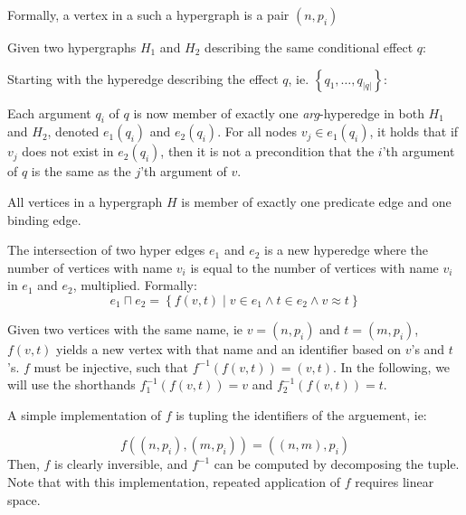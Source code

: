 \documentclass[../Master.tex]{subfiles}
\begin{document}
Formally, a vertex in a such a hypergraph is a pair $\left(n,p_i \right)$

Given two hypergraphs $H_1$ and $H_2$ describing the same conditional effect $q$:

Starting with the hyperedge describing the effect $q$, ie. $\left\{ q_1, \dots, q_{|q|}  \right\}$:

Each argument $q_i$ of $q$ is now member of exactly one \emph{arg}-hyperedge in  both $H_1$ and $H_2$, denoted $e_1(q_i)$ and $e_2(q_i)$. For all nodes $v_j \in e_1(q_i)$, it holds that  if $v_j$ does not exist in $e_2(q_i)$, then it is not a precondition that the $i$'th argument of $q$ is the same as the $j$'th argument of $v$.

\begin{proposition}
    All vertices in a hypergraph $H$ is member of exactly one predicate edge and one binding edge.
\end{proposition}

\begin{definition}
    The intersection of two hyper edges $e_1$ and $e_2$ is a new hyperedge where the number of vertices with name $v_i$ is equal to the number of vertices with name $v_i$ in $e_1$ and $e_2$, multiplied. Formally:
    \begin{equation*}
        e_1 \sqcap e_2 = \left\{
            f(v, t) \; | \;
                v \in e_1 \land t \in e_2 \land v \approx t
        \right\}
    \end{equation*}
\end{definition}

\begin{definition}
    Given two vertices with the same name, ie $v = \left(n, p_i \right)$ and $t = \left( m, p_i \right)$, $f(v,t)$ yields a new vertex with that name and an identifier based on $v$'s and $t$'s. $f$ must be injective, such that $f^{-1}(f(v,t)) = (v,t)$. In the following, we will use the shorthands $f^{-1}_1(f(v,t)) = v$ and $f^{-1}_2(f(v,t)) = t$.
\end{definition}

 A simple implementation of $f$ is tupling the identifiers of the arguement, ie:

\begin{equation*}
    f\left( \left(n, p_i \right), \left(m, p_i \right) \right) =
        \left( (n,m), p_i \right)
\end{equation*}
Then, $f$ is clearly inversible, and $f^{-1}$ can be computed by decomposing the tuple. Note that with this implementation, repeated application of $f$ requires linear space.
\end{document}
